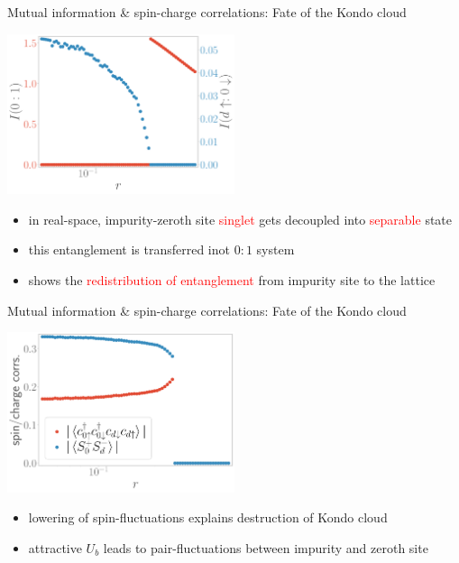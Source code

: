 \documentclass[11pt,aspectratio=169]{beamer}
\newcommand{\focus}[1]{\textcolor{red}{#1}}
\begin{document}
\begin{frame}{Mutual information \& spin-charge correlations: Fate of the Kondo cloud}

\includegraphics[width=0.5\textwidth]{figures/I_r.pdf}

\vspace*{10pt}

\begin{itemize}
	\item in real-space, impurity-zeroth site \focus{singlet} gets decoupled into \focus{separable} state\\[10pt]
\item this entanglement is transferred inot \(0:1\) system\\[10pt]
\item shows the \focus{redistribution of entanglement} from impurity site to the lattice
\end{itemize}

\end{frame}

\begin{frame}{Mutual information \& spin-charge correlations: Fate of the Kondo cloud}

\includegraphics[width=0.5\textwidth]{figures/odlro_d0.pdf}

\vspace*{10pt}

\begin{itemize}
	\item lowering of spin-fluctuations explains destruction of Kondo cloud\\[10pt]
\item attractive \(U_b\) leads to pair-fluctuations between impurity and zeroth site
\end{itemize}

\end{frame}
\end{document}
